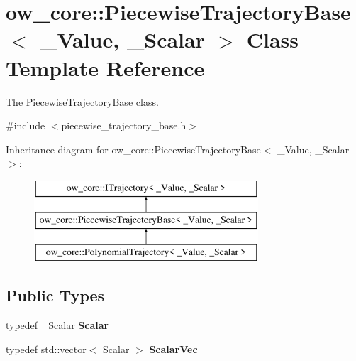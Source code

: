 \hypertarget{classow__core_1_1PiecewiseTrajectoryBase}{}\section{ow\+\_\+core\+:\+:Piecewise\+Trajectory\+Base$<$ \+\_\+\+Value, \+\_\+\+Scalar $>$ Class Template Reference}
\label{classow__core_1_1PiecewiseTrajectoryBase}


The \hyperlink{classow__core_1_1PiecewiseTrajectoryBase}{Piecewise\+Trajectory\+Base} class.  




{\ttfamily \#include $<$piecewise\+\_\+trajectory\+\_\+base.\+h$>$}

Inheritance diagram for ow\+\_\+core\+:\+:Piecewise\+Trajectory\+Base$<$ \+\_\+\+Value, \+\_\+\+Scalar $>$\+:\begin{figure}[H]
\begin{center}
\leavevmode
\includegraphics[height=3.000000cm]{d7/d64/classow__core_1_1PiecewiseTrajectoryBase}
\end{center}
\end{figure}
\subsection*{Public Types}
\begin{DoxyCompactItemize}
\item 
typedef \+\_\+\+Scalar {\bfseries Scalar}\hypertarget{classow__core_1_1PiecewiseTrajectoryBase_a76cb835715513272501ca241e3836caf}{}\label{classow__core_1_1PiecewiseTrajectoryBase_a76cb835715513272501ca241e3836caf}

\item 
typedef std\+::vector$<$ Scalar $>$ {\bfseries Scalar\+Vec}\hypertarget{classow__core_1_1PiecewiseTrajectoryBase_a888723711d232a56664e6f10ab1b8821}{}\label{classow__core_1_1PiecewiseTrajectoryBase_a888723711d232a56664e6f10ab1b8821}

\end{DoxyCompactItemize}

